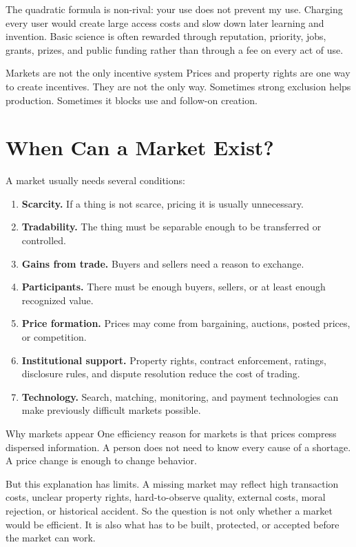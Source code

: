 \documentclass[10pt,a4paper]{article}
\begin{document}
The quadratic formula is non-rival: your use does not prevent my use. Charging every user would create large access costs and slow down later learning and invention. Basic science is often rewarded through reputation, priority, jobs, grants, prizes, and public funding rather than through a fee on every act of use.

\begin{insightbox}{Markets are not the only incentive system}
Prices and property rights are one way to create incentives. They are not the only way. Sometimes strong exclusion helps production. Sometimes it blocks use and follow-on creation.
\end{insightbox}

\section{When Can a Market Exist?}

A market usually needs several conditions:

\begin{enumerate}
  \item \textbf{Scarcity.} If a thing is not scarce, pricing it is usually unnecessary.
  \item \textbf{Tradability.} The thing must be separable enough to be transferred or controlled.
  \item \textbf{Gains from trade.} Buyers and sellers need a reason to exchange.
  \item \textbf{Participants.} There must be enough buyers, sellers, or at least enough recognized value.
  \item \textbf{Price formation.} Prices may come from bargaining, auctions, posted prices, or competition.
  \item \textbf{Institutional support.} Property rights, contract enforcement, ratings, disclosure rules, and dispute resolution reduce the cost of trading.
  \item \textbf{Technology.} Search, matching, monitoring, and payment technologies can make previously difficult markets possible.
\end{enumerate}

\begin{insightbox}{Why markets appear}
One efficiency reason for markets is that prices compress dispersed information. A person does not need to know every cause of a shortage. A price change is enough to change behavior.

But this explanation has limits. A missing market may reflect high transaction costs, unclear property rights, hard-to-observe quality, external costs, moral rejection, or historical accident. So the question is not only whether a market would be efficient. It is also what has to be built, protected, or accepted before the market can work.
\end{insightbox}
\end{document}
